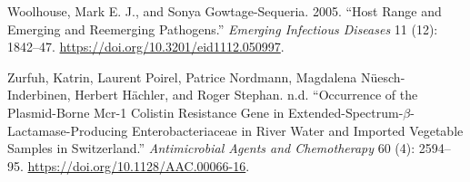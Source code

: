 \documentclass[]{tufte-handout}
\newlength{\cslhangindent}
\newenvironment{CSLReferences}[3] %
 {%
  \setlength{\parindent}{0pt}
  \ifodd #1 \everypar{\setlength{\hangindent}{\cslhangindent}}\ignorespaces\fi
  \ifnum #2 > 0
  \setlength{\parskip}{#2\baselineskip}
  \fi
 }%
 {}
\begin{document}
\begin{CSLReferences}{1}{0}
\leavevmode{}%
Woolhouse, Mark E. J., and Sonya Gowtage-Sequeria. 2005. {``Host Range
and Emerging and Reemerging Pathogens.''} \emph{Emerging Infectious
Diseases} 11 (12): 1842--47.
\url{https://doi.org/10.3201/eid1112.050997}.

\leavevmode{}%
Zurfuh, Katrin, Laurent Poirel, Patrice Nordmann, Magdalena
Nüesch-Inderbinen, Herbert Hächler, and Roger Stephan. n.d.
{``Occurrence of the {Plasmid}-{Borne} Mcr-1 {Colistin Resistance Gene}
in {Extended}-{Spectrum}-{\(\beta\)}-{Lactamase}-{Producing
Enterobacteriaceae} in {River Water} and {Imported Vegetable Samples} in
{Switzerland}.''} \emph{Antimicrobial Agents and Chemotherapy} 60 (4):
2594--95. \url{https://doi.org/10.1128/AAC.00066-16}.

\end{CSLReferences}
\end{document}
